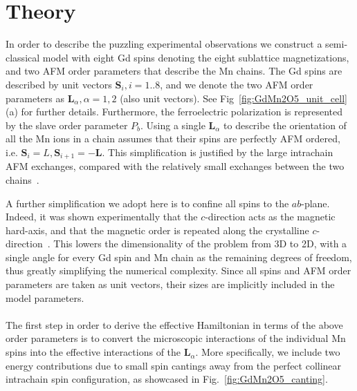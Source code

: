 \section{Theory \label{sec:GdMn2O5_Theory}}
In order to describe the puzzling experimental observations we construct a semi-classical model with eight Gd spins denoting the eight sublattice magnetizations, and two AFM order parameters that describe the Mn chains.
The Gd spins are described by unit vectors $\bm{S}_i, i=1..8$, and we denote the two AFM order parameters as $\bm{L}_\alpha, \alpha=1,2$ (also unit vectors). See Fig~\ref{fig:GdMn2O5_unit_cell}(a) for further details.
Furthermore, the ferroelectric polarization is represented by the slave order parameter $P_b$.
Using a single $\bm{L}_\alpha$ to describe the orientation of all the Mn ions in a chain assumes that their spins are perfectly AFM ordered, i.e. $\bm{S}_i = L, \bm{S}_{i+1} = - \bm{L}$.
This simplification is justified by the large intrachain AFM exchanges, compared with the relatively small exchanges between the two chains~\cite{Souza11}.

A further simplification we adopt here is to confine all spins to the $ab$-plane.
Indeed, it was shown experimentally that the $c$-direction acts as the magnetic hard-axis, and that the magnetic order is repeated along the crystalline $c$-direction~\cite{Lee13}.
This lowers the dimensionality of the problem from 3D to 2D, with a single angle for every Gd spin and Mn chain as the remaining degrees of freedom, thus greatly simplifying the numerical complexity.
Since all spins and AFM order parameters are taken as unit vectors, their sizes are implicitly included in the model parameters.
\\\\
The first step in order to derive the effective Hamiltonian in terms of the above order parameters is to convert the microscopic interactions of the individual Mn spins into the effective interactions of the $\bm{L}_\alpha$.
More specifically, we include two energy contributions due to small spin cantings away from the perfect collinear intrachain spin configuration, as showcased in Fig.~\ref{fig:GdMn2O5_canting}.

\begin{figure*}[h]
    \centering
	\caption{{\bf Energy contributions due to spin canting.} a) The Zeeman contribution due to the weak ferromagnetic moment along the field (H, red arrow), as a result of the spin canting. b) The contribution due to Heisenberg exchange when previously parallel Mn spins are canted towards a more AFM alignment. This is a direct result of the geometric frustration. The collinear configuration is denoted by the black arrows, with the dashed teal arrows showing the orientation due to the slight canting by the angle $\delta \theta$. \label{fig:GdMn2O5_canting}}
\end{figure*}


